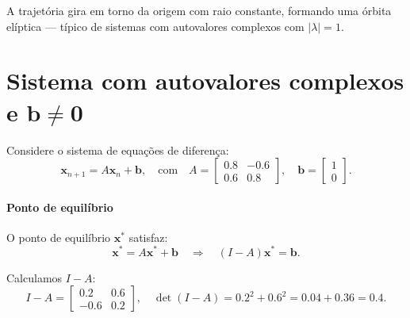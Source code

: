 \documentclass{article}
\begin{document}
\begin{center}
\end{center}

A trajetória gira em torno da origem com raio constante, formando uma
órbita elíptica — típico de sistemas com autovalores complexos com
$|\lambda| = 1$.

\section{Sistema com autovalores complexos e $\mathbf{b} \neq \mathbf{0}$}

Considere o sistema de equações de diferença:
\begin{equation}
\bm{x}_{n+1} = A \bm{x}_n + \bm{b}, \quad \text{com} \quad
A = \begin{bmatrix}
0.8 & -0.6 \\
0.6 & 0.8
\end{bmatrix}, \quad
\bm{b} = \begin{bmatrix}
1 \\
0
\end{bmatrix}.
\end{equation}

\paragraph{Ponto de equilíbrio}

O ponto de equilíbrio $\bm{x}^*$ satisfaz:
\[
\bm{x}^* = A \bm{x}^* + \bm{b} \quad \Rightarrow \quad (I - A)\bm{x}^* = \bm{b}.
\]

Calculamos $I - A$:
\[
I - A = \begin{bmatrix}
0.2 & 0.6 \\
-0.6 & 0.2
\end{bmatrix}, \quad
\det(I - A) = 0.2^2 + 0.6^2 = 0.04 + 0.36 = 0.4.
\]
\end{document}
